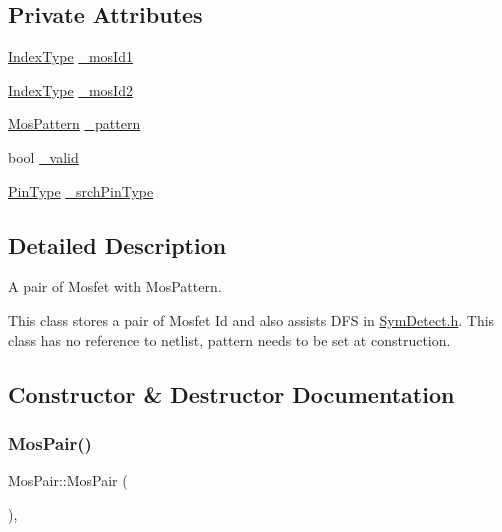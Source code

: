 \subsection*{Private Attributes}
\begin{DoxyCompactItemize}
\item 
\hyperlink{type_8h_a581e8093e28e7362f2b6937296190676}{Index\+Type} \hyperlink{classMosPair_a783f254c414a4b746eadbb9d2e49281b}{\+\_\+mos\+Id1}
\item 
\hyperlink{type_8h_a581e8093e28e7362f2b6937296190676}{Index\+Type} \hyperlink{classMosPair_a4d44569f1b7537fddae9f4c89d5c0f96}{\+\_\+mos\+Id2}
\item 
\hyperlink{type_8h_af19eddb079bfea723256710b029c38e8}{Mos\+Pattern} \hyperlink{classMosPair_a075dadc02f1a5b85d53bf7b2271f8825}{\+\_\+pattern}
\item 
bool \hyperlink{classMosPair_a7a0adcf1db1e0b59d09f1a4270bf8efb}{\+\_\+valid}
\item 
\hyperlink{type_8h_afaab50027002ecbb6c8ac27e727d1bb4}{Pin\+Type} \hyperlink{classMosPair_a81b74a234b444867a693e890126a37a1}{\+\_\+srch\+Pin\+Type}
\end{DoxyCompactItemize}


\subsection{Detailed Description}
A pair of Mosfet with Mos\+Pattern. 

This class stores a pair of Mosfet Id and also assists D\+FS in \hyperlink{SymDetect_8h}{Sym\+Detect.\+h}. This class has no reference to netlist, pattern needs to be set at construction. 

\subsection{Constructor \& Destructor Documentation}
\mbox{\label{classMosPair_ad595508e33836b1645f98d85978375c1}} 
\subsubsection{\texorpdfstring{Mos\+Pair()}{MosPair()}\hspace{0.1cm}{\footnotesize\ttfamily [1/2]}}
{\footnotesize\ttfamily Mos\+Pair\+::\+Mos\+Pair (\begin{DoxyParamCaption}{ }\end{DoxyParamCaption})\hspace{0.3cm}{\ttfamily [explicit]}, {\ttfamily [default]}}



